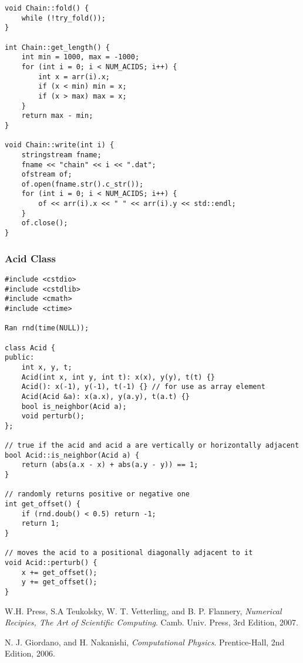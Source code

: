 \documentclass[12pt]{article}
\begin{document}
\begin{lstlisting}
void Chain::fold() {
    while (!try_fold());
}

int Chain::get_length() {
    int min = 1000, max = -1000;
    for (int i = 0; i < NUM_ACIDS; i++) {
        int x = arr(i).x;
        if (x < min) min = x;
        if (x > max) max = x;
    }
    return max - min;
}

void Chain::write(int i) {
    stringstream fname;
    fname << "chain" << i << ".dat";
    ofstream of;
    of.open(fname.str().c_str());
    for (int i = 0; i < NUM_ACIDS; i++) {
        of << arr(i).x << " " << arr(i).y << std::endl;
    }
    of.close();
}
\end{lstlisting}
\subsubsection{Acid Class}
\begin{lstlisting}
#include <cstdio>
#include <cstdlib>
#include <cmath>
#include <ctime>

Ran rnd(time(NULL));

class Acid {
public:
    int x, y, t;
    Acid(int x, int y, int t): x(x), y(y), t(t) {}
    Acid(): x(-1), y(-1), t(-1) {} // for use as array element
    Acid(Acid &a): x(a.x), y(a.y), t(a.t) {}
    bool is_neighbor(Acid a);
    void perturb();
};

// true if the acid and acid a are vertically or horizontally adjacent
bool Acid::is_neighbor(Acid a) {
    return (abs(a.x - x) + abs(a.y - y)) == 1;
}

// randomly returns positive or negative one
int get_offset() {
    if (rnd.doub() < 0.5) return -1;
    return 1;
}

// moves the acid to a positional diagonally adjacent to it
void Acid::perturb() {
    x += get_offset();
    y += get_offset();
}
\end{lstlisting}

\begin{thebibliography}{9}

  W.H. Press, S.A Teukolsky, W. T. Vetterling, and B. P. Flannery,
  \emph{Numerical Recipies, The Art of Scientific Computing}.
  Camb. Univ. Press,
  3rd Edition,
  2007.

    N. J. Giordano, and H. Nakanishi,
    \emph{Computational Physics}.
    Prentice-Hall,
    2nd Edition,
    2006.

\end{thebibliography}
\end{document}
